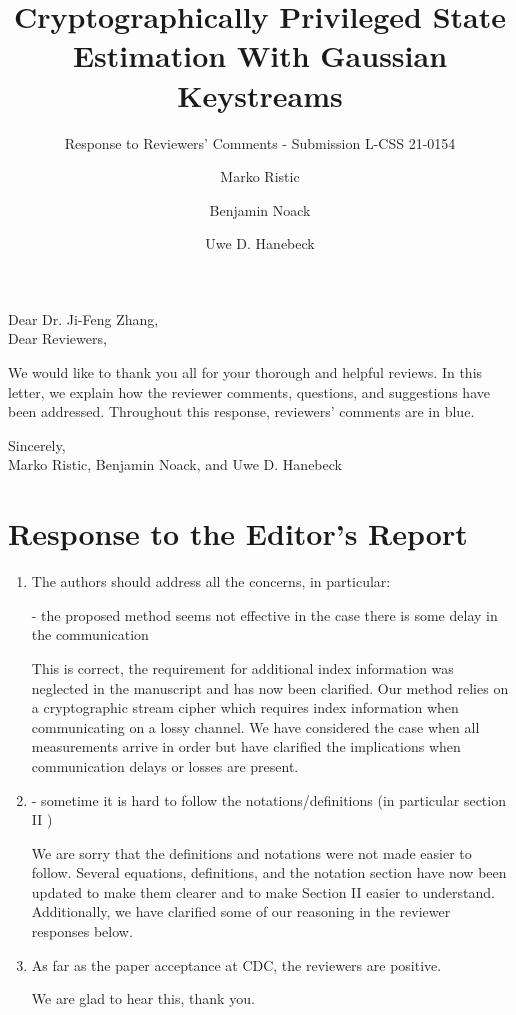 \documentclass[a4paper]{scrartcl}
\title{\boldmath Cryptographically Privileged State Estimation With Gaussian Keystreams}
\subtitle{Response to Reviewers' Comments - Submission L-CSS 21-0154}
\author{Marko Ristic\and Benjamin Noack\and Uwe D. Hanebeck}
\newenvironment{rebuttal}{\begin{enumerate}[label={\color{grey}\thesection.\arabic{enumi}},leftmargin=0pt,ref=\thesection.\arabic{enumi}]}{\end{enumerate}}
\newcommand{\reviewtext}[1]{{\color{nblue} #1}}
\begin{document}
\maketitle

Dear Dr. Ji-Feng Zhang,\\
Dear Reviewers,

We would like to thank you all for your thorough and helpful reviews. In this letter, we explain how the reviewer comments, questions, and suggestions have been addressed. Throughout this response, reviewers' comments are in \reviewtext{blue}. 

Sincerely,\\
Marko Ristic, Benjamin Noack, and Uwe D. Hanebeck




\section*{Response to the Editor's Report}
\def\thesection{E}
\begin{rebuttal} %
\item \reviewtext{The authors should address all the concerns, in particular:

- the proposed method seems not effective in the case there is some delay in the communication}

This is correct, the requirement for additional index information was neglected in the manuscript and has now been clarified. Our method relies on a cryptographic stream cipher which requires index information when communicating on a lossy channel. We have considered the case when all measurements arrive in order but have clarified the implications when communication delays or losses are present.

\item \reviewtext{- sometime it is hard to follow the  notations/definitions (in particular section II )}

We are sorry that the definitions and notations were not made easier to follow. Several equations, definitions, and the notation section have now been updated to make them clearer and to make Section II easier to understand. Additionally, we have clarified some of our reasoning in the reviewer responses below.

\item \reviewtext{As far as the paper acceptance at CDC, the reviewers are positive.}

We are glad to hear this, thank you.

\end{rebuttal}
\end{document}
